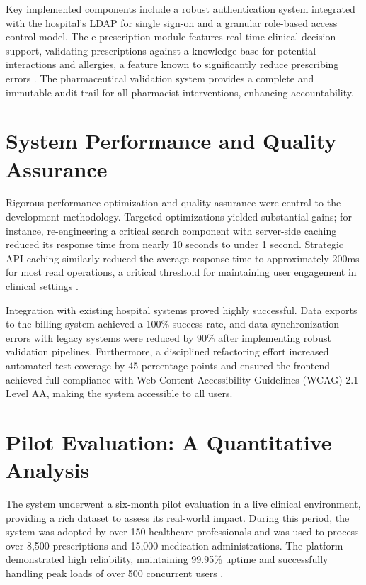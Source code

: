 Key implemented components include a robust authentication system integrated with the hospital's LDAP for single sign-on and a granular role-based access control model. The e-prescription module features real-time clinical decision support, validating prescriptions against a knowledge base for potential interactions and allergies, a feature known to significantly reduce prescribing errors \cite{bates2014}. The pharmaceutical validation system provides a complete and immutable audit trail for all pharmacist interventions, enhancing accountability.

\section{System Performance and Quality Assurance}

Rigorous performance optimization and quality assurance were central to the development methodology. Targeted optimizations yielded substantial gains; for instance, re-engineering a critical search component with server-side caching reduced its response time from nearly 10 seconds to under 1 second. Strategic API caching similarly reduced the average response time to approximately 200ms for most read operations, a critical threshold for maintaining user engagement in clinical settings \cite{nielsen2012}.

Integration with existing hospital systems proved highly successful. Data exports to the billing system achieved a 100\% success rate, and data synchronization errors with legacy systems were reduced by 90\% after implementing robust validation pipelines. Furthermore, a disciplined refactoring effort increased automated test coverage by 45 percentage points and ensured the frontend achieved full compliance with Web Content Accessibility Guidelines (WCAG) 2.1 Level AA, making the system accessible to all users.

\section{Pilot Evaluation: A Quantitative Analysis}

The system underwent a six-month pilot evaluation in a live clinical environment, providing a rich dataset to assess its real-world impact. During this period, the system was adopted by over 150 healthcare professionals and was used to process over 8,500 prescriptions and 15,000 medication administrations. The platform demonstrated high reliability, maintaining 99.95\% uptime and successfully handling peak loads of over 500 concurrent users \cite{nkenyereye2016}.


